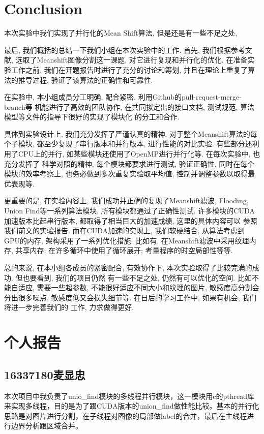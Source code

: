 \documentclass[a4paper, 11pt]{article}
\begin{document}
\clearpage

\section{Conclusion}
本次实验中我们实现了并行化的Mean Shift算法, 但是还是有一些不足之处, 

最后, 我们概括的总结一下我们小组在本次实验中的工作. 首先, 我们根据参考文献,
选取了Meanshift图像分割这一课题, 对它进行复现和并行化的优化. 在准备实验工作之前,
我们在开题报告时进行了充分的讨论和筹划, 并且在理论上重复了算法的推导过程,
验证了该算法的正确性和可靠性.

在实验中, 本小组成员分工明确, 配合紧密. 利用Github的pull-request-merge-branch等
机能进行了高效的团队协作, 在共同拟定出的接口文档, 测试规范, 算法模型等文件的指导下很好的实现了模块化
的分工和合作.

具体到实验设计上, 我们充分发挥了严谨认真的精神, 对于整个Meanshift算法的每个子模块, 都至少复现了串行版本和并行版本,
进行性能的对比实验. 有些部分还利用了CPU上的并行, 如某些模块还使用了OpenMP进行并行化等. 在每次实验中, 也充分发挥了
科学对照的精神, 每个模块都要求进行测试, 验证正确性. 同时在每个模块的效率考察上, 也务必做到多次重复实验取平均值,
控制并调整参数以取得最优表现等.

更重要的是, 在实验内容上, 我们成功并正确的复现了Meanshift滤波, Flooding, Union Find等一系列算法模块, 
所有模块都通过了正确性测试. 许多模块的CUDA加速版本比起串行版本, 都取得了相当巨大的加速成绩, 这里的具体内容可以
参照我们前文的实验报告. 而在CUDA加速的实现上, 我们软硬结合, 从算法考虑到GPU的内存, 架构采用了一系列优化措施.
比如有, 在Meanshift滤波中采用纹理内存, 共享内存; 在许多循环中使用了循环展开; 考量程序的时空局部性等等.


总的来说, 在本小组各成员的紧密配合, 有效协作下, 本次实验取得了比较完满的成功. 但也要看到, 我们的项目仍然
有一些不足之处, 仍然有可以优化的空间. 比如不能自适应, 需要一些超参数, 不能很好适应不同大小和纹理的图片, 
敏感度高分割会分出很多噪点, 敏感度低又会损失细节等. 在日后的学习工作中, 如果有机会, 我们将进一步完善我们的
工作, 力求做得更好.




\clearpage
\medskip
\printbibliography

\clearpage
\appendix
\section{个人报告}
\subsection{16337180麦显忠}
本次项目中我负责了unio\_find模块的多线程并行模块，这一模块用c的pthread库来实现多线程，目的是为了跟CUDA版本的union\_find做性能比较。基本的并行化思路是对图片进行分割，在子线程对图像的局部做label的合并，最后在主线程进行边界分析跟区域合并。
\end{document}
